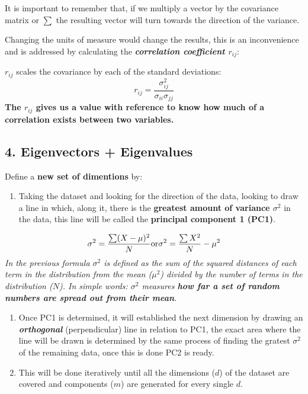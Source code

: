 \documentclass[]{book}
\providecommand{\tightlist}{%
  \setlength{\itemsep}{0pt}\setlength{\parskip}{0pt}}
\begin{document}
It is important to remember that, if we multiply a vector by the
covariance matrix or \(\sum\) the resulting vector will turn towards the
direction of the variance.

Changing the units of measure would change the results, this is an
inconvenience and is addressed by calculating the
\textbf{\emph{correlation coefficient \(r_{ij}\)}}:

\(r_{ij}\) scales the covariance by each of the standard deviations:
\[r_{ij} = \frac{\sigma_{ij}^2}{\sigma_{ii} \sigma_{jj}}\] \textbf{The
\(r_{ij}\) gives us a value with reference to know how much of a
correlation exists between two variables.}

\subsection{4. Eigenvectors +
Eigenvalues}\label{eigenvectors-eigenvalues}

Define a \textbf{new set of dimentions} by:

\begin{enumerate}
\def\labelenumi{\arabic{enumi}.}
\tightlist
\item
  Taking the dataset and looking for the direction of the data, looking
  to draw a line in which, along it, there is the \textbf{greatest
  amount of variance \(\sigma^2\)} in the data, this line will be called
  the \textbf{principal component 1 (PC1)}.
\end{enumerate}

\[\sigma^2 = \frac{\sum(X-\mu)^2}{N}\space \space  \text{or}\space \space \sigma^2 = \frac{\sum X^2}{N} - \mu^2\]
\emph{In the previous formula \(\sigma^2\) is defined as the sum of the
squared distances of each term in the distribution from the mean
(\(\mu^2\)) divided by the number of terms in the distribution (\(N\)).
In simple words: \(\sigma^2\) measures \textbf{how far a set of random
numbers are spread out from their mean}.}

\begin{enumerate}
\def\labelenumi{\arabic{enumi}.}
\setcounter{enumi}{1}
\item
  Once PC1 is determined, it will established the next dimension by
  drawing an \textbf{\emph{orthogonal}} (perpendicular) line in relation
  to PC1, the exact area where the line will be drawn is determined by
  the same process of finding the gratest \(\sigma^2\) of the remaining
  data, once this is done PC2 is ready.
\item
  This will be done iteratively until all the dimensions (\(d\)) of the
  dataset are covered and components (\(m\)) are generated for every
  single \(d\).
\end{enumerate}
\end{document}
